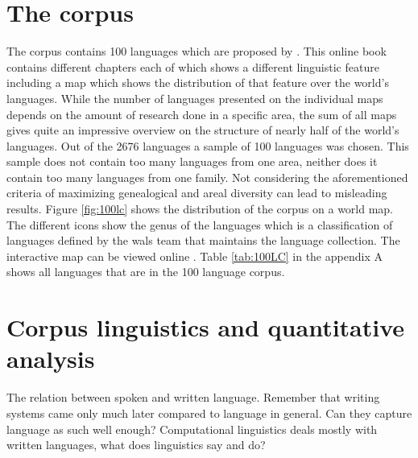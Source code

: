 \label{chap:1b_background}

\section{The corpus}
\label{corpus}
The corpus contains 100 languages which are proposed by \citet{Comrie&Dryer.2013}. This online book contains different chapters each of which shows a different linguistic feature including a map which shows the distribution of that feature over the world's languages. While the number of languages presented on the individual maps depends on the amount of research done in a specific area, the sum of all maps gives quite an impressive overview on the structure of nearly half of the world's languages. Out of the 2676 languages a sample of 100 languages was chosen. This sample does not contain too many languages from one area, neither does it contain too many languages from one family. Not considering the aforementioned criteria of maximizing genealogical and areal diversity can lead to misleading results. Figure \ref{fig:100lc} shows the distribution of the corpus on a world map. The different icons show the genus of the languages which is a classification of languages defined by the \ac{wals} team that maintains the language collection. The interactive map can be viewed online \citep{100LC.21.07.2021}. Table \ref{tab:100LC} in the appendix A shows all languages that are in the 100 language corpus. 


\section{Corpus linguistics and quantitative analysis}
The relation between spoken and written language. Remember that writing systems came only much later compared to language in general. Can they capture language as such well enough? Computational linguistics deals mostly with written languages, what does linguistics say and do?

